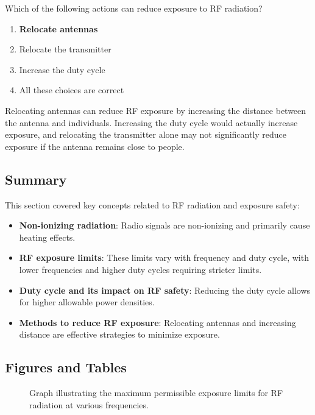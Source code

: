 
\begin{tcolorbox}[colback=gray!10!white,colframe=black!75!black,title={T0C08}]
Which of the following actions can reduce exposure to RF radiation?
\begin{enumerate}[label=\Alph*),noitemsep]
    \item \textbf{Relocate antennas}
    \item Relocate the transmitter
    \item Increase the duty cycle
    \item All these choices are correct
\end{enumerate}
\end{tcolorbox}
Relocating antennas can reduce RF exposure by increasing the distance between the antenna and individuals. Increasing the duty cycle would actually increase exposure, and relocating the transmitter alone may not significantly reduce exposure if the antenna remains close to people.


\subsection*{Summary}
This section covered key concepts related to RF radiation and exposure safety:
\begin{itemize}
    \item \textbf{Non-ionizing radiation}: Radio signals are non-ionizing and primarily cause heating effects.
    \item \textbf{RF exposure limits}: These limits vary with frequency and duty cycle, with lower frequencies and higher duty cycles requiring stricter limits.
    \item \textbf{Duty cycle and its impact on RF safety}: Reducing the duty cycle allows for higher allowable power densities.
    \item \textbf{Methods to reduce RF exposure}: Relocating antennas and increasing distance are effective strategies to minimize exposure.
\end{itemize}

\subsection*{Figures and Tables}
\begin{figure}[h!]
    \centering
    \caption{Graph illustrating the maximum permissible exposure limits for RF radiation at various frequencies.}
    \label{fig:rf_exposure_limits}
\end{figure}

